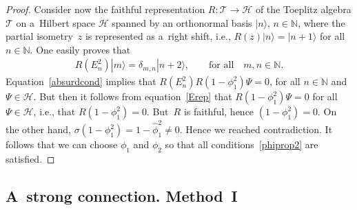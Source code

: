 \documentclass[pdftex]{sigma}
\begin{document}
\begin{proof}
Consider now the faithful representation $R:{\mathcal{T}}\rightarrow\mathcal{H}$ of the Toeplitz algebra ${\mathcal{T}}$
on a~Hilbert space $\mathcal{H}$ spanned by an orthonormal basis $|n\rangle$, $n\in{\mathbb N}$, where the partial
isometry~$z$ is represented as a~right shift, i.e., $R(z)|n\rangle=|n+1\rangle$ for all $n\in{\mathbb N}$.
One easily proves that
\begin{gather}
\label{Erep}
R(E_n^2)|m\rangle=\delta_{m,n}|n+2\rangle,
\qquad
\text{for all}\quad  m,n\in{\mathbb N}.
\end{gather}
Equation~\eqref{absurdcond} implies that $R(E_n^2)R(1-\phi_1^2)\Psi=0$, for all $n\in{\mathbb N}$ and $\Psi\in\mathcal{H}$.
But then it follows from equation~\eqref{Erep} that $R(1-\phi_1^2)\Psi=0$ for all $\Psi\in\mathcal{H}$, i.e., that
$R(1-\phi_1^2)=0$.
But~$R$ is faithful, hence $(1-\phi_1^2)=0$.
On the other hand, $\sigma(1-\phi_1^2)=1-\hat\phi_1^2\neq 0$.
Hence we reached contradiction.
It follows that we can choose $\phi_1$ and $\phi_2$ so that all conditions~\eqref{phiprop2} are satisf\/ied.
\end{proof}

\subsection{A~strong connection. Method~I}
\end{document}

